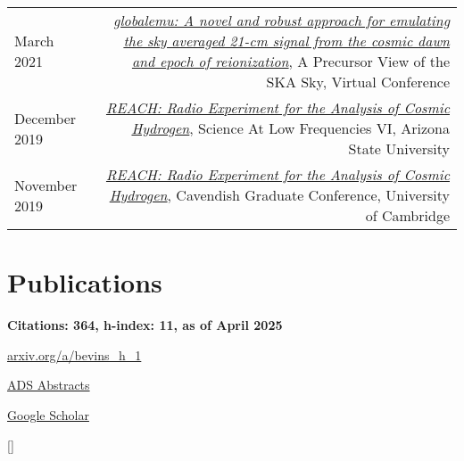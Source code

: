 \documentclass{article}
\begin{document}
\begin{tabular}{L!{\vrule}R}
	March 2021 & \href{https://github.com/htjb/Talks/blob/master/Posters/SKA_globalemu_March_2021/globalemu.pdf}{\textit{globalemu: A novel and robust approach for emulating the sky averaged 21-cm signal from the cosmic dawn and epoch of reionization}}, A Precursor View of the SKA Sky, Virtual Conference\\
	December 2019 & \href{https://drive.google.com/file/d/1dvgumyu4cXxXqoYxikU3DKOa4u_gpGzn/view}{\textit{REACH: Radio Experiment for the Analysis of Cosmic Hydrogen}}, Science At Low Frequencies VI, Arizona State University \\
	November 2019 & \href{https://github.com/htjb/Talks/blob/master/Posters/Cav_Graduate_Conf_REACH_Nov_2019/REACH_poster.pdf}{\textit{REACH: Radio Experiment for the Analysis of Cosmic Hydrogen}}, Cavendish Graduate Conference, University of Cambridge
\end{tabular}

\section*{Publications}
\noindent \textbf{Citations: 364, h-index: 11, as of April 2025}

\noindent \href{http://arxiv.org/a/bevins_h_1}{arxiv.org/a/bevins\_h\_1}

\noindent \href{https://ui.adsabs.harvard.edu/search/p_=0&q=author\%3A\%22Bevins\%2C\%20H.\%20T.\%20J.\%22&sort=date\%20desc\%2C\%20bibcode\%20desc}{ADS Abstracts}

\noindent \href{https://scholar.google.com/citations?user=03_3YwQAAAAJ&hl=en}{Google Scholar}

[]{%
}

\nocite{*}
\printbibliography[title={},heading=bibintoc]
\end{document}
